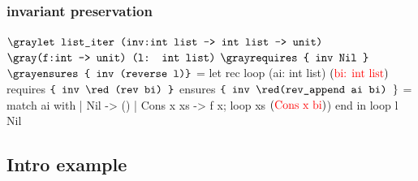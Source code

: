 \begin{frame}[fragile]
\frametitle{invariant preservation}
\begin{footnotesize}
\begin{whycode}
${\gray\texttt{let list\_iter (inv:int list -> int list -> unit)}}$ 
    ${\gray\texttt{(f:int -> unit) (l: int list)}}$
     ${\gray\texttt{requires \{ inv Nil \}}}$
     ${\gray\texttt{ensures \{ inv (reverse l)\}}}$    
 = let rec loop (ai: int list) $(\textcolor{red}{\text{bi: int list}})$
      requires  $\texttt{\{  inv {\red (rev bi)} \}}$
      ensures   $\texttt{\{  inv {\red(rev\_append ai bi)} }\}$  
    = match ai with 
       | Nil       -> ()
       | Cons x xs -> f x; loop xs $(\textcolor{red}{\text{Cons x bi}})$) end
   in loop l Nil
\end{whycode}
\end{footnotesize}
\end{frame}

\subsection*{Intro example}



